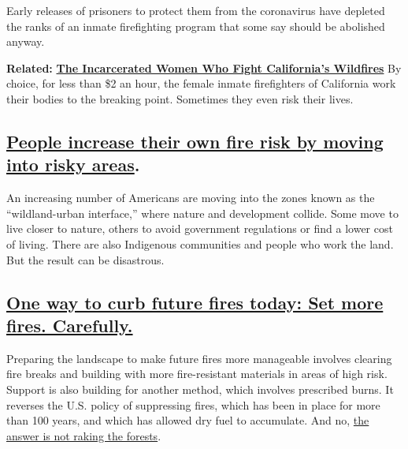 Early releases of prisoners to protect them from the coronavirus have
depleted the ranks of an inmate firefighting program that some say
should be abolished anyway.

\textbf{Related:}
\textbf{\href{https://www.nytimes3xbfgragh.onion/2017/08/31/magazine/the-incarcerated-women-who-fight-californias-wildfires.html}{The
Incarcerated Women Who Fight California's Wildfires}} By choice, for
less than \$2 an hour, the female inmate firefighters of California work
their bodies to the breaking point. Sometimes they even risk their
lives.

\hypertarget{people-increase-their-own-fire-risk-by-moving-into-risky-areas}{%
\subsection{\texorpdfstring{\href{https://www.nytimes3xbfgragh.onion/2018/11/15/climate/california-fires-wildland-urban-interface.html}{People
increase their own fire risk by moving into risky
areas}.}{People increase their own fire risk by moving into risky areas.}}\label{people-increase-their-own-fire-risk-by-moving-into-risky-areas}}

An increasing number of Americans are moving into the zones known as the
``wildland-urban interface,'' where nature and development collide. Some
move to live closer to nature, others to avoid government regulations or
find a lower cost of living. There are also Indigenous communities and
people who work the land. But the result can be disastrous.

\hypertarget{one-way-to-curb-future-fires-today-set-more-fires-carefully}{%
\subsection{\texorpdfstring{\href{https://www.nytimes3xbfgragh.onion/2020/08/26/us/california-fire-prevention.html?action=click\&module=RelatedLinks\&pgtype=Article}{One
way to curb future fires today: Set more fires.
Carefully.}}{One way to curb future fires today: Set more fires. Carefully.}}\label{one-way-to-curb-future-fires-today-set-more-fires-carefully}}

Preparing the landscape to make future fires more manageable involves
clearing fire breaks and building with more fire-resistant materials in
areas of high risk. Support is also building for another method, which
involves prescribed burns. It reverses the U.S. policy of suppressing
fires, which has been in place for more than 100 years, and which has
allowed dry fuel to accumulate. And no,
\href{https://www.nytimes3xbfgragh.onion/2018/11/18/world/europe/finland-california-wildfires-trump-raking.html}{the
answer is not raking the forests}.

